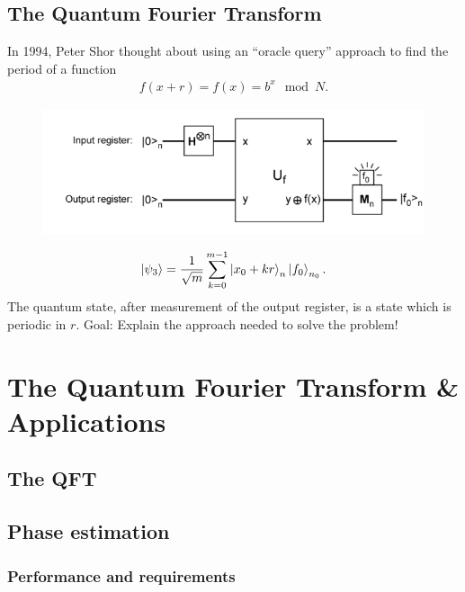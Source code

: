 \documentclass{book}
\theoremstyle{definition}
\newcommand{\f}[2]{\frac{#1}{#2}}
\begin{document}
\subsection{The Quantum Fourier Transform}
In 1994, Peter Shor thought about using an ``oracle query''
approach to find the period of a function 
\begin{align}
f(x+r) = f(x) = b^x \mod N.
\end{align}
\begin{figure}[!htb]
	\centering
	\includegraphics[scale=0.5]{shor6}
\end{figure}
\begin{align}
\ket{\psi_3} = \f{1}{\sqrt{m}}\sum^{m-1}_{k=0} \ket{x_0 + kr}_n \ket{f_0}_{n_0}.
\end{align}
The quantum state, after measurement of the output register, is
a state which is periodic in $r$. Goal: Explain the approach needed to solve the problem!


 









\newpage


\section{The Quantum Fourier Transform \& Applications}


\subsection{The QFT}
\subsection{Phase estimation}
\subsubsection{Performance and requirements}
\end{document}
